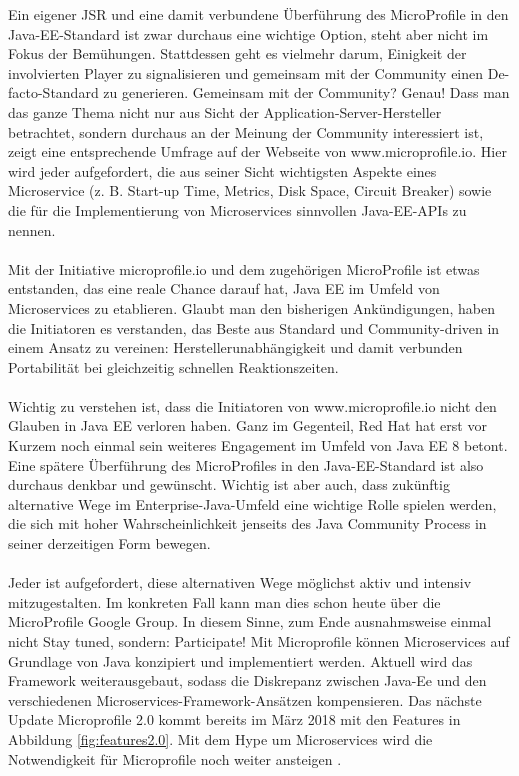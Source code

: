 Ein eigener JSR und eine damit verbundene Überführung des MicroProfile in den Java-EE-Standard ist zwar durchaus eine wichtige Option, steht aber nicht im Fokus der Bemühungen. Stattdessen geht es vielmehr darum, Einigkeit der involvierten Player zu signalisieren und gemeinsam mit der Community einen De-facto-Standard zu generieren. Gemeinsam mit der Community? Genau! Dass man das ganze Thema nicht nur aus Sicht der Application-Server-Hersteller betrachtet, sondern durchaus an der Meinung der Community interessiert ist, zeigt eine entsprechende Umfrage auf der Webseite von www.microprofile.io. Hier wird jeder aufgefordert, die aus seiner Sicht wichtigsten Aspekte eines Microservice (z. B. Start-up Time, Metrics, Disk Space, Circuit Breaker) sowie die für die Implementierung von Microservices sinnvollen Java-EE-APIs zu nennen. \\ \\
Mit der Initiative microprofile.io und dem zugehörigen MicroProfile ist etwas entstanden, das eine reale Chance darauf hat, Java EE im Umfeld von Microservices zu etablieren. Glaubt man den bisherigen Ankündigungen, haben die Initiatoren es verstanden, das Beste aus Standard und Community-driven in einem Ansatz zu vereinen: Herstellerunabhängigkeit und damit verbunden Portabilität bei gleichzeitig schnellen Reaktionszeiten.\\ \\
Wichtig zu verstehen ist, dass die Initiatoren von www.microprofile.io nicht den Glauben in Java EE verloren haben. Ganz im Gegenteil, Red Hat hat erst vor Kurzem noch einmal sein weiteres Engagement im Umfeld von Java EE 8 betont. Eine spätere Überführung des MicroProfiles in den Java-EE-Standard ist also durchaus denkbar und gewünscht. Wichtig ist aber auch, dass zukünftig alternative Wege im Enterprise-Java-Umfeld eine wichtige Rolle spielen werden, die sich mit hoher Wahrscheinlichkeit jenseits des Java Community Process in seiner derzeitigen Form bewegen.\\ \\
Jeder ist aufgefordert, diese alternativen Wege möglichst aktiv und intensiv mitzugestalten. Im konkreten Fall kann man dies schon heute über die MicroProfile Google Group. In diesem Sinne, zum Ende ausnahmsweise einmal nicht Stay tuned, sondern: Participate!
Mit Microprofile können Microservices auf Grundlage von Java konzipiert und implementiert werden. Aktuell wird das Framework weiterausgebaut, sodass die Diskrepanz zwischen Java-Ee und den verschiedenen Microservices-Framework-Ansätzen kompensieren. Das nächste Update Microprofile 2.0 kommt bereits im März 2018 mit den Features in Abbildung \ref{fig:features2.0}. Mit dem Hype um Microservices wird die Notwendigkeit für Microprofile noch weiter ansteigen \cite{LarsRowekamp.2018}.


